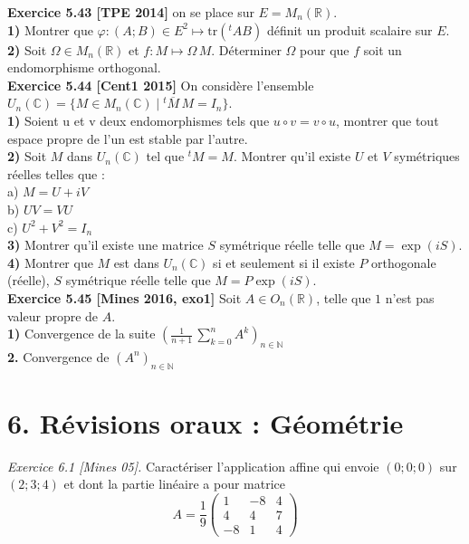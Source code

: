 \documentclass[a4paper,12pt,francais]{article}
\newcommand{\field}[1]{\mathbb{#1}}
\newcommand{\N}{\field{N}}
\newcommand{\R}{\field{R}}
\newcommand{\C}{\field{C}}
\newcommand{\tr}{\mbox{tr}}
\begin{document}
\noindent
{\bf Exercice 5.43 [TPE 2014]} on se place sur $E=M_n(\R)$.\\
{\bf 1)} Montrer que $\varphi :(A;B)\in E^2 \mapsto \tr(^tAB)$ définit un produit scalaire sur $E$.\\
{\bf 2)} Soit $\Omega \in M_n(\R)$ et $f : M \mapsto \Omega \, M$. Déterminer $\Omega$ pour que $f$ soit un endomorphisme orthogonal.\\

\noindent
{\bf Exercice 5.44 [Cent1 2015]} %
On considère l'ensemble $U_n(\C) = \{ M \in M_n(\C) \; | \;  ^t \overline{M}\, M = I_n\}$.\\
{\bf 1)} Soient u et v deux endomorphismes tels que $u \circ v = v \circ u$, montrer que tout espace propre de l'un est stable par l'autre.\\
{\bf 2)} Soit $M$ dans $U_n(\C)$ tel que $^tM = M$. Montrer qu'il existe $U$ et $V$ symétriques réelles telles que :\\
\indent 
a) $M = U + iV$\\
\indent
b) $UV = VU$\\
\indent
c) $U^2 + V^2 = I_n$\\
{\bf 3)} Montrer qu'il existe une matrice $S$ symétrique réelle telle que $M = \exp(iS)$.\\
{\bf 4)} Montrer que $M$ est dans $U_n(\C)$ si et seulement si il existe $P$ orthogonale (réelle), $S$ symétrique réelle telle que $M = P \exp(iS)$.\\

\noindent
{\bf Exercice 5.45 [Mines 2016, exo1]} %
Soit $A \in O_n(\R)$, telle que $1$ n'est pas valeur propre de $A$.\\
{\bf 1)} Convergence de la suite 
$\displaystyle \left({
\frac{1}{n+1} \, \sum_{k=0}^n  A^k} \right)_{ n \in \N}$\\
{\bf 2.} Convergence de $(A^n)_{n \in \N}$\\



\newpage
\section*{6. Révisions oraux : Géométrie} %

\noindent
{\it Exercice 6.1 [Mines 05].} Caractériser l'application affine qui
envoie $(0;0;0)$ sur $(2;3;4)$ et dont la partie linéaire a pour
matrice
$$A=\frac{1}{9}
\left({\begin{array}{ccc}
1&-8&4\\
4&4&7\\
-8&1&4
\end{array}
}\right)$$
\end{document}
